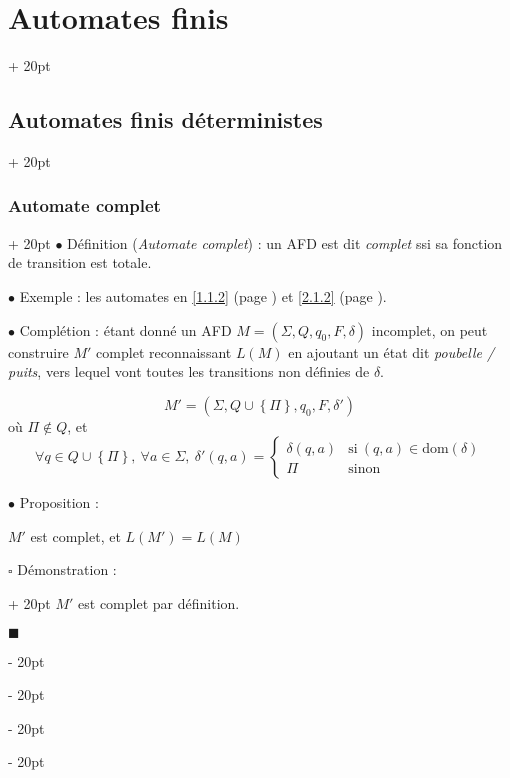 \documentclass[a4paper, 12pt, twoside]{article}
\newcommand{\set}[1]{\left\{ #1 \right\}}
\newcommand{\ind}[1][20pt]{\advance\leftskip + #1}
\newcommand{\deind}[1][20pt]{\advance\leftskip - #1}
\newenvironment{indt}[2][20pt]{#2 \par \ind[#1]}{\par \deind} %
\newenvironment{proof}[1][{Démonstration :}]{\begin{indt}{$\square$ #1}}{$\blacksquare$ \end{indt}}
\begin{document}
\begin{indt}{\section{Automates finis}}
\begin{indt}{\subsection{Automates finis déterministes}}
            \vspace{12pt}
            
            \begin{indt}{\subsubsection{Automate complet}}
                $\bullet$ Définition (\emph{Automate complet}) : un AFD est dit \emph{complet} ssi sa fonction de transition est totale.

                \vspace{12pt}
                
                $\bullet$ Exemple : les automates en \ref{1.1.2} (page \pageref{1.1.2}) et \ref{2.1.2} (page \pageref{2.1.2}).

                \vspace{12pt}
                
                $\bullet$ Complétion : étant donné un AFD $M = (\Sigma, Q, q_0, F, \delta)$ incomplet, on peut construire $M'$ complet reconnaissant $L(M)$ en ajoutant un état dit \emph{poubelle / puits}, vers lequel vont toutes les transitions non définies de $\delta$.

                \[
                    M' = (\Sigma, Q \cup \set \Pi, q_0, F, \delta')
                \]
                où $\Pi \notin Q$, et
                \[
                    \forall q \in Q \cup \set \Pi,\ \forall a \in \Sigma,\
                    \delta'(q, a) =
                    \begin{cases}
                        \delta(q, a)
                        & \text{si}\ (q, a) \in \mathrm{dom}(\delta)
                        \\
                        \Pi
                        & \text{sinon}
                    \end{cases}
                \]

                \vspace{12pt}
                
                $\bullet$ Proposition :
                \begin{emphBox}
                    $M'$ est complet, et $L(M') = L(M)$
                \end{emphBox}

                \vspace{6pt}
                
                \begin{proof}
                    $M'$ est complet par définition.


\end{proof}
\end{indt}
\end{indt}
\end{indt}
\end{document}
